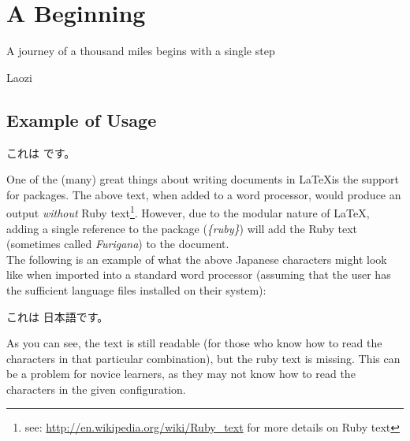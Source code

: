 \chapter{A Beginning}


\epigraph{A journey of a thousand miles begins with a single step}{Laozi}




\section{Example of Usage}
\begin{CJK}{UTF8}{min}
これは  です。\\
\end{CJK}
\indent{}One of the (many) great things about writing documents in \LaTeX is the support for packages. The above text, when added to a word processor, would produce an output \emph{without} Ruby text\footnote{see: \url{http://en.wikipedia.org/wiki/Ruby_text} for more details on Ruby text}. However, due to the modular nature of \LaTeX, adding a single reference to the package (\emph{\{ruby\}}) will add the Ruby text (sometimes called \emph{Furigana}) to the document.\\
\indent{}The following is an example of what the above Japanese characters might look like when imported into a standard word processor (assuming that the user has the sufficient language files installed on their system):\\
\begin{CJK}{UTF8}{min}
\indent{}これは 日本語です。\\
\end{CJK}
\indent{}As you can see, the text is still readable (for those who know how to read the characters in that particular combination), but the ruby text is missing. This can be a problem for novice learners, as they may not know how to read the characters in the given configuration.
